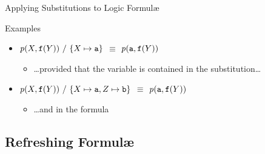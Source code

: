 \documentclass[presentation]{beamer}\mode<presentation>{\usetheme{AMSBolognaFC}}
\begin{document}
\begin{frame}[allowframebreaks]{Applying Substitutions to Logic Formul\ae{}}
\begin{exampleblock}{Examples}
\begin{itemize}
            \item[] \alert{$\text{\textit{p}}(X, \mathtt{f}(Y)) \ /\  \{ X \mapsto \mathtt{a} \}$} $\equiv$ $\text{\textit{p}}(\mathtt{a}, \mathtt{f}(Y))$
            \begin{itemize}
                \item \ldots provided that the variable is contained in the substitution\ldots
            \end{itemize} 

            \item[] \alert{$\text{\textit{p}}(X, \mathtt{f}(Y)) \ /\  \{ X \mapsto \mathtt{a}, Z \mapsto \mathtt{b} \}$} $\equiv$ $\text{\textit{p}}(\mathtt{a}, \mathtt{f}(Y))$
            \begin{itemize}
                \item \ldots and in the formula
            \end{itemize} 
        \end{itemize}
    \end{exampleblock}
\end{frame}

\subsection{Refreshing Formul\ae{}}
\end{document}
